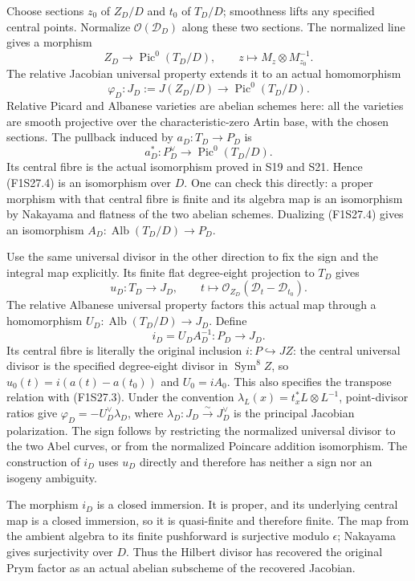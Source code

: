 Choose sections $z_0$ of $Z_D/D$ and $t_0$ of $T_D/D$;
smoothness lifts any specified central points. Normalize
$\mathcal O(\mathcal D_D)$ along these two sections.
The normalized line gives a morphism
\[
 Z_D\longrightarrow\operatorname{Pic}^0(T_D/D),
 \qquad z\longmapsto M_z\otimes M_{z_0}^{-1}.
\]
The relative Jacobian universal property extends it to an
actual homomorphism
\[
 \varphi_D:J_D:=J(Z_D/D)\longrightarrow
                     \operatorname{Pic}^0(T_D/D).
 \tag{F1S27.3}
\]
Relative Picard and Albanese varieties are abelian schemes
here: all the varieties are smooth projective over the
characteristic-zero Artin base, with the chosen sections.
The pullback induced by $a_D:T_D\to P_D$ is
\[
 a_D^*:P_D^\vee\longrightarrow\operatorname{Pic}^0(T_D/D).
 \tag{F1S27.4}
\]
Its central fibre is the actual isomorphism proved in S19
and S21. Hence (F1S27.4) is an isomorphism over $D$.
One can check this directly: a proper morphism with that
central fibre is finite and its algebra map is an isomorphism
by Nakayama and flatness of the two abelian schemes.
Dualizing (F1S27.4) gives an isomorphism
$A_D:\operatorname{Alb}(T_D/D)\to P_D$.

Use the same universal divisor in the other direction to
fix the sign and the integral map explicitly. Its finite
flat degree-eight projection to $T_D$ gives
\[
 u_D:T_D\longrightarrow J_D,\qquad
 t\longmapsto\mathcal O_{Z_D}(\mathcal D_t-\mathcal D_{t_0}).
\]
The relative Albanese universal property factors this actual
map through a homomorphism
$U_D:\operatorname{Alb}(T_D/D)\to J_D$.
Define
\[
                 i_D=U_DA_D^{-1}:P_D\longrightarrow J_D.
 \tag{F1S27.5}
\]
Its central fibre is literally the original inclusion
$i:P\hookrightarrow JZ$: the central universal divisor is
the specified degree-eight divisor in $\operatorname{Sym}^8Z$,
so $u_0(t)=i(a(t)-a(t_0))$ and $U_0=iA_0$.
This also specifies the transpose relation with (F1S27.3).
Under the convention $\lambda_L(x)=t_x^*L\otimes L^{-1}$,
point-divisor ratios give
$\varphi_D=-U_D^\vee\lambda_D$, where
$\lambda_D:J_D\xrightarrow{\sim}J_D^\vee$ is the principal
Jacobian polarization. The sign follows by restricting the
normalized universal divisor to the two Abel curves, or
from the normalized Poincare addition isomorphism.
The construction of $i_D$ uses $u_D$ directly and therefore
has neither a sign nor an isogeny ambiguity.

The morphism $i_D$ is a closed immersion. It is proper, and
its underlying central map is a closed immersion, so it is
quasi-finite and therefore finite. The map from the ambient
algebra to its finite pushforward is surjective modulo
$\epsilon$; Nakayama gives surjectivity over $D$.
Thus the Hilbert divisor has recovered the original Prym
factor as an actual abelian subscheme of the recovered Jacobian.

